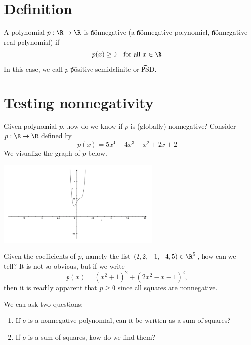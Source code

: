 
\section*{Definition}

A polynomial $p: \R  \to \R $ is \t{nonnegative} (a \t{nonnegative polynomial}, \t{nonnegative real polynomial}) if
\[
p(x) \geq 0 \quad \text{for all } x \in \R
\]
In this case, we call $p$ \t{positive semidefinite} or \t{PSD}.

\section*{Testing nonnegativity}

Given polynomial $p$, how do we know if $p$ is (globally) nonnegative?
Consider $p: \R  \to \R $ defined by
\[
p(x) = 5x^4 - 4x^3 - x^2 + 2x + 2
\]
We visualize the graph of $p$ below.

\begin{center}\includegraphics[width=0.60\textwidth]{./graphics/poly_sos_example.png}\end{center}
Given the coefficients of $p$, namely the list $(2, 2, -1, -4, 5) \in \R ^5$, how can we tell?
It is not so obvious, but if we write
\[
p(x) = (x^2 + 1)^2 + (2x^2 - x - 1)^2,
\]
then it is readily apparent that $p \geq 0$ since all squares are nonnegative.

We can ask two questions:
    \begin{enumerate}
      \item If $p$ is a nonnegative polynomial, can it be written as a sum of squares?
      \item If $p$ is a sum of squares, how do we find them?
    \end{enumerate}

\blankpage